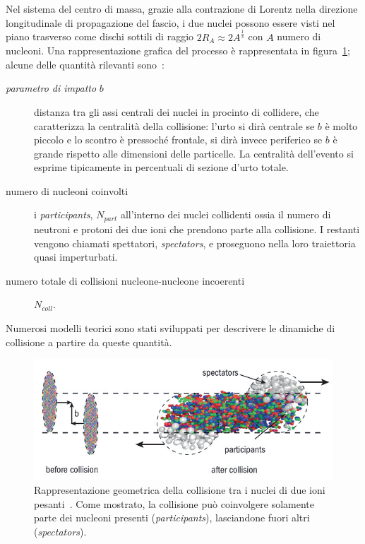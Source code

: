         Nel sistema del centro di massa, grazie alla contrazione di Lorentz nella direzione longitudinale di propagazione del fascio, i due nuclei possono essere visti nel piano trasverso come dischi sottili di raggio $2 R_A \approx 2 A^{\frac{1}{3}}$ con $A$ numero di nucleoni. Una rappresentazione grafica del processo è rappresentata in figura~\ref{fig:4-centrality}; alcune delle quantità rilevanti sono~\cite{Salgado_2009}:
        \begin{description}
            \item[\textit{parametro di impatto} $b$] distanza tra gli assi centrali dei nuclei in procinto di collidere, che caratterizza la centralità della collisione: l'urto si dirà centrale se $b$ è molto piccolo e lo scontro è pressoché frontale, si dirà invece periferico se $b$ è grande rispetto alle dimensioni delle particelle. La centralità dell'evento si esprime tipicamente in percentuali di sezione d'urto totale.
            
            \item[numero di nucleoni coinvolti] i \textit{participants}, $N_{part}$ all'interno dei nuclei collidenti ossia il numero di neutroni e protoni dei due ioni che prendono parte alla collisione. I restanti vengono chiamati spettatori, \textit{spectators}, e proseguono nella loro traiettoria quasi imperturbati. 
            
            \item[numero totale di collisioni nucleone-nucleone incoerenti] $N_{coll}$.
        \end{description}
        Numerosi modelli teorici sono stati sviluppati per descrivere le dinamiche di collisione a partire da queste quantità.

        \begin{figure}[t]
            \centering
            \includegraphics[width=0.8\linewidth]{res/fig/1-chapter/4-centrality.png}
            \caption{Rappresentazione geometrica della collisione tra i nuclei di due ioni pesanti~\cite{Toia_2013}. Come mostrato, la collisione può coinvolgere solamente parte dei nucleoni presenti (\textit{participants}), lasciandone fuori altri (\textit{spectators}).}
            \label{fig:4-centrality}
        \end{figure}

